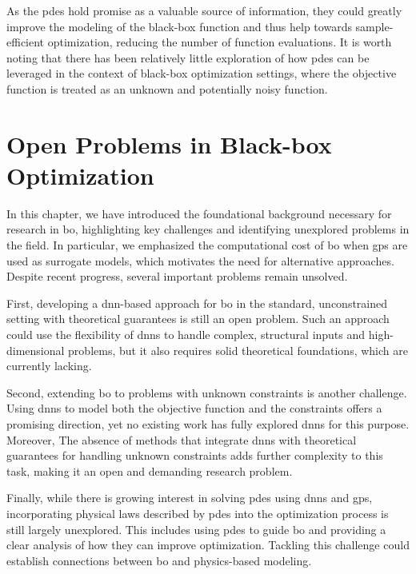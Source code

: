 As the \acp{pde} hold promise as a valuable source of information, they could greatly improve the modeling of the black-box function and thus help towards sample-efficient optimization, reducing the number of function evaluations. It is worth noting that there has been relatively little exploration of how \acp{pde} can be leveraged in the context of black-box optimization settings, where the objective function is treated as an unknown and potentially noisy function.


\section{Open Problems in Black-box Optimization}
\label{section:bo_further_research}

In this chapter, we have introduced the foundational background necessary for research in \acl{bo}, highlighting key challenges and identifying unexplored problems in the field. In particular, we emphasized the computational cost of \ac{bo} when \aclp{gp} are used as surrogate models, which motivates the need for alternative approaches. Despite recent progress, several important problems remain unsolved.

First, developing a \ac{dnn}-based approach for \ac{bo} in the standard, unconstrained setting with theoretical guarantees is still an open problem. Such an approach could use the flexibility of \acp{dnn} to handle complex, structural inputs and high-dimensional problems, but it also requires solid theoretical foundations, which are currently lacking.


Second, extending \ac{bo} to problems with unknown constraints is another challenge. Using \acp{dnn} to model both the objective function and the constraints offers a promising direction, yet no existing work has fully explored \acp{dnn} for this purpose. Moreover, The absence of methods that integrate \acp{dnn} with theoretical guarantees for handling unknown constraints adds further complexity to this task, making it an open and demanding research problem.

Finally, while there is growing interest in solving \acfp{pde} using \acfp{dnn} and \acfp{gp}, incorporating physical laws described by \acp{pde} into the optimization process is still largely unexplored. This includes using \acp{pde} to guide \ac{bo} and providing a clear analysis of how they can improve optimization. Tackling this challenge could establish connections between \ac{bo} and physics-based modeling.


